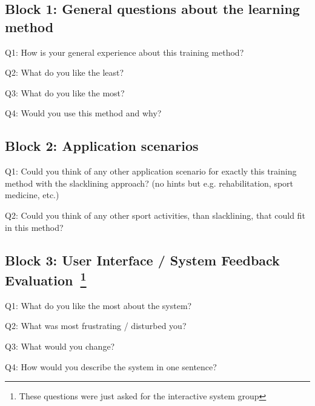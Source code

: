 \begin{appendices}
\subsection*{Block 1: General questions about the learning method}
Q1: How is your general experience about this training method?

Q2: What do you like the least?

Q3: What do you like the most?

Q4: Would you use this method and why?\\

\subsection*{Block 2: Application scenarios}
Q1: Could you think of any other application scenario for exactly this training method with the slacklining approach? (no hints but e.g. rehabilitation, sport medicine, etc.)

Q2: Could you think of any other sport activities, than slacklining, that could fit in this method?\\

\subsection*{Block 3: User Interface / System Feedback Evaluation~\footnote{These questions were just asked for the interactive system group}}
Q1: What do you like the most about the system?

Q2: What was most frustrating / disturbed you?

Q3: What would you change?

Q4: How would you describe the system in one sentence?


\end{appendices}
